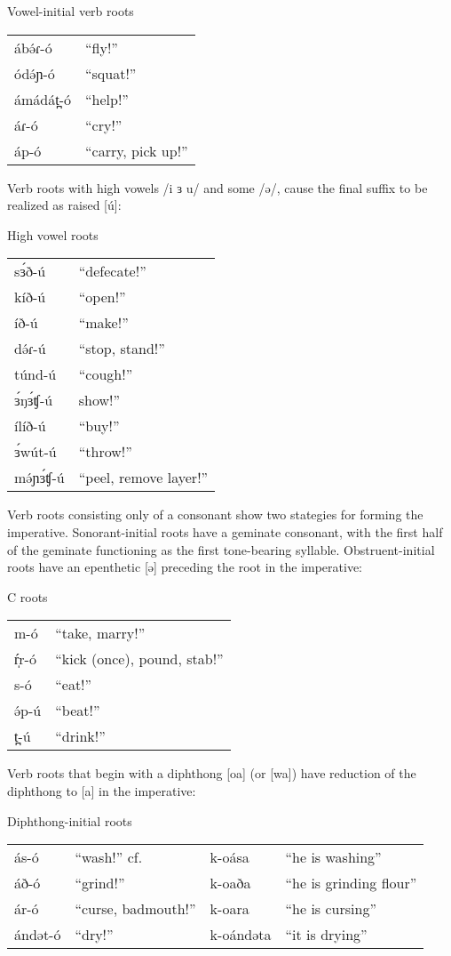 \ea Vowel-initial verb roots\\
\begin{tabular}[t]{ll}
ábə́ɾ-ó		&	“fly!”\\
ódə́ɲ-ó		&	“squat!”\\
ámádát̪-ó	&	“help!”\\
áɾ-ó		&	“cry!”\\
áp-ó		&	“carry, pick up!”\\
	
\end{tabular}
\z

Verb roots with high vowels /i ɜ u/ and some /ə/, cause the final suffix to be realized as raised [ú]:

\ea High vowel roots\\
\begin{tabular}[t]{ll}
sɜ́ð-ú	&		“defecate!”\\
kíð-ú	&		“open!”\\
íð-ú	&		“make!”\\
də́ɾ-ú	&		“stop, stand!”\\
túnd-ú	&		“cough!”\\
ɜ́ŋɜ́ʧ-ú	&		show!”\\
ílíð-ú	&		“buy!”\\
ɜ́wút-ú	&		“throw!”\\
mə́ɲɜ́ʧ-ú	&		“peel, remove layer!”\\
\end{tabular}
\z

Verb roots consisting only of a consonant show two stategies for forming the imperative. Sonorant-initial roots have a geminate consonant, with the first half of the geminate functioning as the first tone-bearing syllable. Obstruent-initial roots have an epenthetic [ə] preceding the root in the imperative:

\ea C roots\\
\begin{tabular}[t]{ll}
m-ó		&	“take, marry!”\\
ŕ̩r-ó	&	“kick (once), pound, stab!”\\
s-ó		&	“eat!”\\
ə́p-ú		&	“beat!”\\
t̪-ú		&	“drink!”\\
\end{tabular}
\z

Verb roots that begin with a diphthong [oa] (or [wa]) have reduction of the diphthong to [a] in the imperative:

\ea Diphthong-initial roots\\
\begin{tabular}[t]{llll}
ás-ó	&	“wash!” \hspace{35pt} cf.&   	k-oása 	&		“he is washing”\\
áð-ó	&	“grind!”&	k-oaða		&		“he is grinding flour”\\
ár-ó	&	“curse, badmouth!”	&	k-oara	&		“he is cursing”\\
ándət-ó	&	“dry!”	&	k-oándəta	&	“it is drying”\\
\end{tabular}
\z

